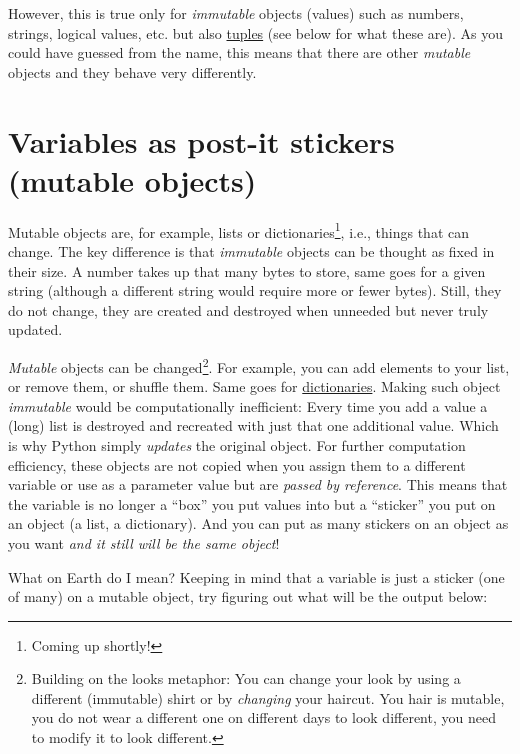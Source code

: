 \documentclass[
]{book}
\begin{document}
However, this is true only for \emph{immutable} objects (values) such as numbers, strings, logical values, etc. but also \href{https://docs.python.org/3/library/stdtypes.html?highlight=tuple\#tuple}{tuples} (see below for what these are). As you could have guessed from the name, this means that there are other \emph{mutable} objects and they behave very differently.

\hypertarget{mutable-objects}{%
\section{Variables as post-it stickers (mutable objects)}\label{mutable-objects}}

Mutable objects are, for example, lists or dictionaries\footnote{Coming up shortly!}, i.e., things that can change. The key difference is that \emph{immutable} objects can be thought as fixed in their size. A number takes up that many bytes to store, same goes for a given string (although a different string would require more or fewer bytes). Still, they do not change, they are created and destroyed when unneeded but never truly updated.

\emph{Mutable} objects can be changed\footnote{Building on the looks metaphor: You can change your look by using a different (immutable) shirt or by \emph{changing} your haircut. You hair is mutable, you do not wear a different one on different days to look different, you need to modify it to look different.}. For example, you can add elements to your list, or remove them, or shuffle them. Same goes for \href{https://docs.python.org/3/tutorial/datastructures.html?highlight=dictionary\#dictionaries}{dictionaries}. Making such object \emph{immutable} would be computationally inefficient: Every time you add a value a (long) list is destroyed and recreated with just that one additional value. Which is why Python simply \emph{updates} the original object. For further computation efficiency, these objects are not copied when you assign them to a different variable or use as a parameter value but are \emph{passed by reference}. This means that the variable is no longer a ``box'' you put values into but a ``sticker'' you put on an object (a list, a dictionary). And you can put as many stickers on an object as you want \emph{and it still will be the same object}!

What on Earth do I mean? Keeping in mind that a variable is just a sticker (one of many) on a mutable object, try figuring out what will be the output below:
\end{document}
